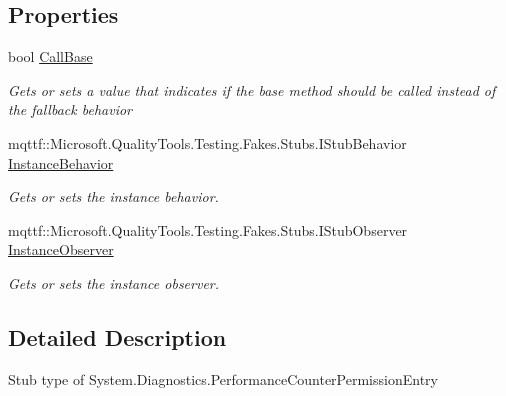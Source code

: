 \subsection*{Properties}
\begin{DoxyCompactItemize}
\item 
bool \hyperlink{class_system_1_1_diagnostics_1_1_fakes_1_1_stub_performance_counter_permission_entry_ac52643a5731ef73189c9f22c6d447e30}{Call\-Base}
\begin{DoxyCompactList}\small\item\em Gets or sets a value that indicates if the base method should be called instead of the fallback behavior\end{DoxyCompactList}\item 
mqttf\-::\-Microsoft.\-Quality\-Tools.\-Testing.\-Fakes.\-Stubs.\-I\-Stub\-Behavior \hyperlink{class_system_1_1_diagnostics_1_1_fakes_1_1_stub_performance_counter_permission_entry_a53fdfe610a75174d6bc2fa4f8a4108ba}{Instance\-Behavior}
\begin{DoxyCompactList}\small\item\em Gets or sets the instance behavior.\end{DoxyCompactList}\item 
mqttf\-::\-Microsoft.\-Quality\-Tools.\-Testing.\-Fakes.\-Stubs.\-I\-Stub\-Observer \hyperlink{class_system_1_1_diagnostics_1_1_fakes_1_1_stub_performance_counter_permission_entry_ac4f26f55f098fdf7df7276339bec7501}{Instance\-Observer}
\begin{DoxyCompactList}\small\item\em Gets or sets the instance observer.\end{DoxyCompactList}\end{DoxyCompactItemize}


\subsection{Detailed Description}
Stub type of System.\-Diagnostics.\-Performance\-Counter\-Permission\-Entry



